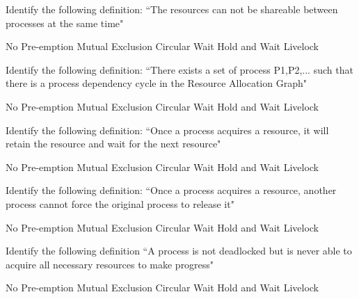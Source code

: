 \variant
Identify the following definition: ``The resources can not be shareable between processes at the same time"
\begin{answers}
\answer No Pre-emption 
\correctanswer Mutual Exclusion
\answer Circular Wait 
\answer Hold and Wait
\answer Livelock
\end{answers}
\begin{solution}
\end{solution}





\variant
Identify the following definition: ``There exists a set of process {P1,P2,...} such that there is a process dependency cycle in the Resource Allocation Graph"
\begin{answers}
\answer No Pre-emption 
\answer Mutual Exclusion
\correctanswer Circular Wait 
\answer Hold and Wait
\answer Livelock
\end{answers}
\begin{solution}
\end{solution}



\variant
Identify the following definition: ``Once a process acquires a resource, it will retain the resource and wait for the next resource"
\begin{answers}
\answer No Pre-emption 
\answer Mutual Exclusion
\answer Circular Wait 
\correctanswer Hold and Wait
\answer Livelock
\end{answers}
\begin{solution}
\end{solution}



\variant
Identify the following definition: ``Once a process acquires a resource, another process cannot force the original process to release it"
\begin{answers}
\correctanswer No Pre-emption 
\answer Mutual Exclusion
\answer Circular Wait 
\answer Hold and Wait
\answer Livelock
\end{answers}
\begin{solution}
\end{solution}


\variant
Identify the following definition ``A process is not deadlocked but is never able to acquire all necessary resources to make progress"
\begin{answers}
\answer No Pre-emption 
\answer Mutual Exclusion
\answer Circular Wait 
\answer Hold and Wait
\correctanswer Livelock
\end{answers}
\begin{solution}
\end{solution}



